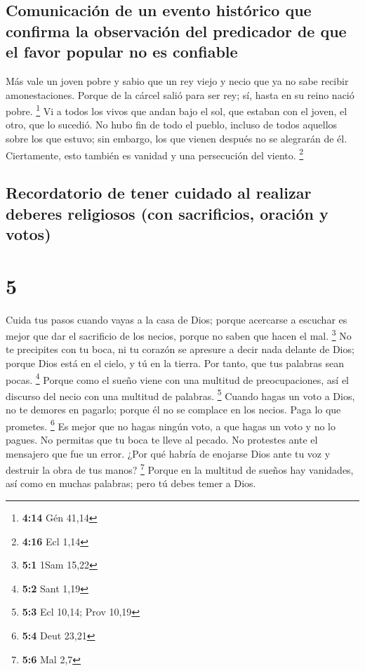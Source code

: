 \hypertarget{comunicaciuxf3n-de-un-evento-histuxf3rico-que-confirma-la-observaciuxf3n-del-predicador-de-que-el-favor-popular-no-es-confiable}{%
\subsection{Comunicación de un evento histórico que confirma la
observación del predicador de que el favor popular no es
confiable}\label{comunicaciuxf3n-de-un-evento-histuxf3rico-que-confirma-la-observaciuxf3n-del-predicador-de-que-el-favor-popular-no-es-confiable}}

 Más vale un joven pobre y sabio que un rey viejo y necio
que ya no sabe recibir amonestaciones.  Porque de la
cárcel salió para ser rey; sí, hasta en su reino nació pobre.
\footnote{\textbf{4:14} Gén 41,14}  Vi a todos los vivos
que andan bajo el sol, que estaban con el joven, el otro, que lo
sucedió.  No hubo fin de todo el pueblo, incluso de todos
aquellos sobre los que estuvo; sin embargo, los que vienen después no se
alegrarán de él. Ciertamente, esto también es vanidad y una persecución
del viento. \footnote{\textbf{4:16} Ecl 1,14}

\hypertarget{recordatorio-de-tener-cuidado-al-realizar-deberes-religiosos-con-sacrificios-oraciuxf3n-y-votos}{%
\subsection{Recordatorio de tener cuidado al realizar deberes religiosos
(con sacrificios, oración y
votos)}\label{recordatorio-de-tener-cuidado-al-realizar-deberes-religiosos-con-sacrificios-oraciuxf3n-y-votos}}

\hypertarget{section-4}{%
\section{5}\label{section-4}}

 Cuida tus pasos cuando vayas a la casa de Dios; porque
acercarse a escuchar es mejor que dar el sacrificio de los necios,
porque no saben que hacen el mal. \footnote{\textbf{5:1} 1Sam 15,22}
 No te precipites con tu boca, ni tu corazón se apresure a
decir nada delante de Dios; porque Dios está en el cielo, y tú en la
tierra. Por tanto, que tus palabras sean pocas. \footnote{\textbf{5:2}
  Sant 1,19}  Porque como el sueño viene con una multitud
de preocupaciones, así el discurso del necio con una multitud de
palabras. \footnote{\textbf{5:3} Ecl 10,14; Prov 10,19} 
Cuando hagas un voto a Dios, no te demores en pagarlo; porque él no se
complace en los necios. Paga lo que prometes. \footnote{\textbf{5:4}
  Deut 23,21}  Es mejor que no hagas ningún voto, a que
hagas un voto y no lo pagues.  No permitas que tu boca te
lleve al pecado. No protestes ante el mensajero que fue un error. ¿Por
qué habría de enojarse Dios ante tu voz y destruir la obra de tus manos?
\footnote{\textbf{5:6} Mal 2,7}  Porque en la multitud de
sueños hay vanidades, así como en muchas palabras; pero tú debes temer a
Dios.

